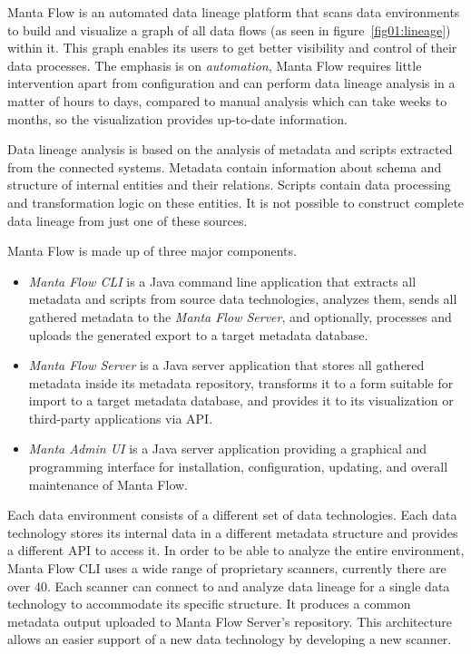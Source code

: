 Manta Flow is an automated data lineage platform that scans data environments to build and visualize a graph of all data flows (as seen in figure~\ref{fig01:lineage}) within it. This graph enables its users to get better visibility and control of their data processes. The emphasis is on \textit{automation}, Manta Flow requires little intervention apart from configuration and can perform data lineage analysis in a matter of hours to days, compared to manual analysis which can take weeks to months, so the visualization provides up-to-date information.
\par
Data lineage analysis is based on the analysis of metadata and scripts extracted from the connected systems. Metadata contain information about schema and structure of internal entities and their relations. Scripts contain data processing and transformation logic on these entities. It is not possible to construct complete data lineage from just one of these sources.
\par
Manta Flow is made up of three major components.
\begin{itemize}
    \item \textit{Manta Flow CLI} is a Java command line application that extracts all metadata and scripts from source data technologies, analyzes them, sends all gathered metadata to the \textit{Manta Flow Server}, and optionally, processes and uploads the generated export to a target metadata database.
    \item \textit{Manta Flow Server} is a Java server application that stores all gathered metadata inside its metadata repository, transforms it to a form suitable for import to a target metadata database, and provides it to its visualization or third-party applications via API.
    \item \textit{Manta Admin UI} is a Java server application providing a graphical and programming interface for installation, configuration, updating, and overall maintenance of Manta Flow.
\end{itemize}
\par
Each data environment consists of a different set of data technologies. Each data technology stores its internal data in a different metadata structure and provides a different API to access it. In order to be able to analyze the entire environment, Manta Flow CLI uses a wide range of proprietary scanners, currently there are over 40. Each scanner can connect to and analyze data lineage for a single data technology to accommodate its specific structure. It produces a common metadata output uploaded to Manta Flow Server's repository. This architecture allows an easier support of a new data technology by developing a new scanner.

